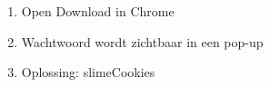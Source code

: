 \begin{enumerate}
  \item Open Download in Chrome
  \item Wachtwoord wordt zichtbaar in een pop-up
  \item Oplossing: slimeCookies
\end{enumerate}